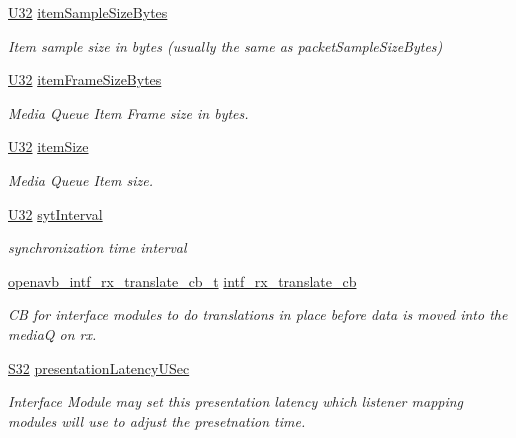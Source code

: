\begin{DoxyCompactItemize}
\hyperlink{openavb__types__base__pub_8h_a696390429f2f3b644bde8d0322a24124}{U32} \hyperlink{structmedia__q__pub__map__uncmp__audio__info__t_a3efebc8b73cdf8c8d500c5d88a1e8558}{item\+Sample\+Size\+Bytes}
\begin{DoxyCompactList}\small\item\em Item sample size in bytes (usually the same as packet\+Sample\+Size\+Bytes) \end{DoxyCompactList}\item 
\hyperlink{openavb__types__base__pub_8h_a696390429f2f3b644bde8d0322a24124}{U32} \hyperlink{structmedia__q__pub__map__uncmp__audio__info__t_a5e067b4fe2d5bde1db69eb4a8899f808}{item\+Frame\+Size\+Bytes}
\begin{DoxyCompactList}\small\item\em Media Queue Item Frame size in bytes. \end{DoxyCompactList}\item 
\hyperlink{openavb__types__base__pub_8h_a696390429f2f3b644bde8d0322a24124}{U32} \hyperlink{structmedia__q__pub__map__uncmp__audio__info__t_a91e248b2730fbe7951ac5d9d3aae1752}{item\+Size}
\begin{DoxyCompactList}\small\item\em Media Queue Item size. \end{DoxyCompactList}\item 
\hyperlink{openavb__types__base__pub_8h_a696390429f2f3b644bde8d0322a24124}{U32} \hyperlink{structmedia__q__pub__map__uncmp__audio__info__t_afaaad205c0ba4c425e4bb5ecbce2a82a}{syt\+Interval}
\begin{DoxyCompactList}\small\item\em synchronization time interval \end{DoxyCompactList}\item 
\hyperlink{include_2openavb__intf__pub_8h_af5a3f257a91f68caaf684c105b1a58d1}{openavb\+\_\+intf\+\_\+rx\+\_\+translate\+\_\+cb\+\_\+t} \hyperlink{structmedia__q__pub__map__uncmp__audio__info__t_a91c52495b5f10c5c17d4f1406f4d963b}{intf\+\_\+rx\+\_\+translate\+\_\+cb}
\begin{DoxyCompactList}\small\item\em CB for interface modules to do translations in place before data is moved into the mediaQ on rx. \end{DoxyCompactList}\item 
\hyperlink{openavb__types__base__pub_8h_a39c786017723555afb9e8b85accec0de}{S32} \hyperlink{structmedia__q__pub__map__uncmp__audio__info__t_a8a0134ba67426c5ef2ad240d4f82dcfc}{presentation\+Latency\+U\+Sec}
\begin{DoxyCompactList}\small\item\em Interface Module may set this presentation latency which listener mapping modules will use to adjust the presetnation time. \end{DoxyCompactList}\end{DoxyCompactItemize}


